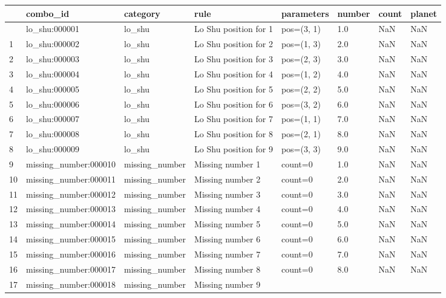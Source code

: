 \documentclass[
  american,
  11pt,
  oneside,
  openany]{article}
\begin{document}
\label{num-catalog}
\begin{longtable}[]{@{}llllllll@{}}
\toprule\noalign{}
& combo\_id & category & rule & parameters & number & count & planet \\
\midrule\noalign{}
\endhead
\bottomrule\noalign{}
\endlastfoot
0 & lo\_shu:000001 & lo\_shu & Lo Shu position for 1 & pos=(3, 1) & 1.0
& NaN & NaN \\
1 & lo\_shu:000002 & lo\_shu & Lo Shu position for 2 & pos=(1, 3) & 2.0
& NaN & NaN \\
2 & lo\_shu:000003 & lo\_shu & Lo Shu position for 3 & pos=(2, 3) & 3.0
& NaN & NaN \\
3 & lo\_shu:000004 & lo\_shu & Lo Shu position for 4 & pos=(1, 2) & 4.0
& NaN & NaN \\
4 & lo\_shu:000005 & lo\_shu & Lo Shu position for 5 & pos=(2, 2) & 5.0
& NaN & NaN \\
5 & lo\_shu:000006 & lo\_shu & Lo Shu position for 6 & pos=(3, 2) & 6.0
& NaN & NaN \\
6 & lo\_shu:000007 & lo\_shu & Lo Shu position for 7 & pos=(1, 1) & 7.0
& NaN & NaN \\
7 & lo\_shu:000008 & lo\_shu & Lo Shu position for 8 & pos=(2, 1) & 8.0
& NaN & NaN \\
8 & lo\_shu:000009 & lo\_shu & Lo Shu position for 9 & pos=(3, 3) & 9.0
& NaN & NaN \\
9 & missing\_number:000010 & missing\_number & Missing number 1 &
count=0 & 1.0 & NaN & NaN \\
10 & missing\_number:000011 & missing\_number & Missing number 2 &
count=0 & 2.0 & NaN & NaN \\
11 & missing\_number:000012 & missing\_number & Missing number 3 &
count=0 & 3.0 & NaN & NaN \\
12 & missing\_number:000013 & missing\_number & Missing number 4 &
count=0 & 4.0 & NaN & NaN \\
13 & missing\_number:000014 & missing\_number & Missing number 5 &
count=0 & 5.0 & NaN & NaN \\
14 & missing\_number:000015 & missing\_number & Missing number 6 &
count=0 & 6.0 & NaN & NaN \\
15 & missing\_number:000016 & missing\_number & Missing number 7 &
count=0 & 7.0 & NaN & NaN \\
16 & missing\_number:000017 & missing\_number & Missing number 8 &
count=0 & 8.0 & NaN & NaN \\
17 & missing\_number:000018 & missing\_number & Missing number 9 &

\end{longtable}
\end{document}
